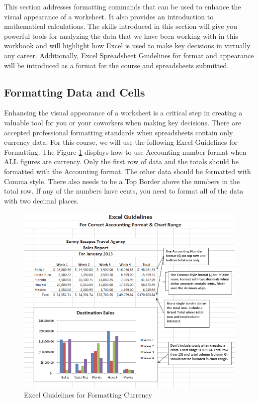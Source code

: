 This section addresses formatting commands that can be used to enhance the visual appearance of a worksheet. It also provides an introduction to mathematical calculations. The skills introduced in this section will give you powerful tools for analyzing the data that we have been working with in this workbook and will highlight how Excel is used to make key decisions in virtually any career. Additionally, Excel Spreadsheet Guidelines for format and appearance will be introduced as a format for the course and spreadsheets submitted.

\subsection{Formatting Data and Cells}

Enhancing the visual appearance of a worksheet is a critical step in creating a valuable tool for you or your coworkers when making key decisions. There are accepted professional formatting standards when spreadsheets contain only currency data. For this course, we will use the following Excel Guidelines for Formatting. The Figure \ref{01:fig32} displays how to use Accounting number format when ALL figures are currency. Only the first row of data and the totals should be formatted with the Accounting format. The other data should be formatted with Comma style. There also needs to be a Top Border above the numbers in the total row. If any of the numbers have cents, you need to format all of the data with two decimal places.

\begin{figure}[H]
	\centering
	\includegraphics[width=\maxwidth{.95\linewidth}]{gfx/ch01_fig32}
	\caption{Excel Guidelines for Formatting Currency}
	\label{01:fig32}
\end{figure}

